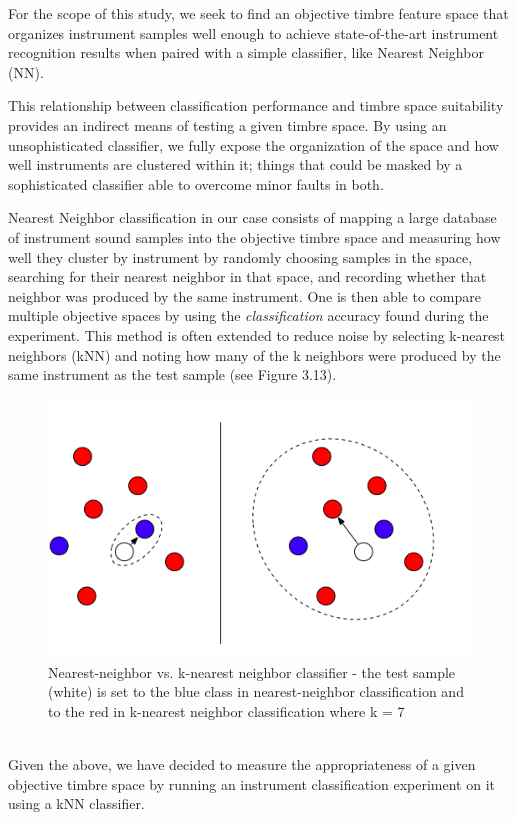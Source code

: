 \documentclass[a4paper,12pt]{report} 	%
\numberwithin{figure}{chapter}
\numberwithin{table}{chapter}
\numberwithin{equation}{chapter}
\begin{document}
\begin{flushleft}
For the scope of this study, we seek to find an objective timbre feature space that organizes instrument samples well enough to achieve state-of-the-art instrument recognition results when paired with a simple classifier, like Nearest Neighbor (NN).

This relationship between classification performance and timbre space suitability provides an indirect means of testing a given timbre space. By using an unsophisticated classifier, we fully expose the organization of the space and how well instruments are clustered within it; things that could be masked by a sophisticated classifier able to overcome minor faults in both.

Nearest Neighbor classification in our case consists of mapping a large database of instrument sound samples into the objective timbre space and measuring how well they cluster by instrument by randomly choosing samples in the space, searching for their nearest neighbor in that space, and recording whether that neighbor was produced by the same instrument. One is then able to compare multiple objective spaces by using the \emph{classification} accuracy found during the experiment. This method is often extended to reduce noise by selecting k-nearest neighbors (kNN) and noting how many of the k neighbors were produced by the same instrument as the test sample (see Figure 3.13).
\begin{figure}[h!]
\begin{center}
\includegraphics[scale=0.5]{NearestNeighbor}
\caption[Nearest-neighbor vs. k-nearest neighbor classifier]{Nearest-neighbor vs. k-nearest neighbor classifier - the test sample (white) is set to the blue class in nearest-neighbor classification and to the red in k-nearest neighbor classification where k = 7}
\end{center}
\end{figure}
\\
Given the above, we have decided to measure the appropriateness of a given objective timbre space by running an instrument classification experiment on it using a kNN classifier.


\end{flushleft}
\end{document}
